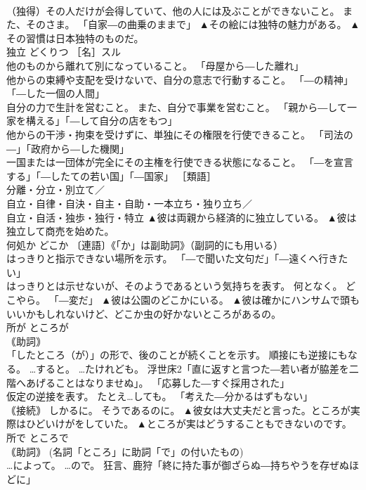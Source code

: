 \documentclass[8pt]{extreport}
\begin{document}
\begin{CJK}{UTF8}{min}
\\	（独得）その人だけが会得していて、他の人には及ぶことができないこと。 また、そのさま。 「自家―の曲乗のままで」	▲その絵には独特の魅力がある。 ▲その習慣は日本独特のものだ。
\\	独立	どくりつ	［名］スル 
\\	他のものから離れて別になっていること。 「母屋から―した離れ」 
\\	他からの束縛や支配を受けないで、自分の意志で行動すること。 「―の精神」「―した一個の人間」 
\\	自分の力で生計を営むこと。 また、自分で事業を営むこと。 「親から―して一家を構える」「―して自分の店をもつ」 
\\	他からの干渉・拘束を受けずに、単独にその権限を行使できること。 「司法の―」「政府から―した機関」 
\\	一国または一団体が完全にその主権を行使できる状態になること。 「―を宣言する」「―したての若い国」「―国家」 ［類語］
\\	分離・分立・別立て／
\\	自立・自律・自決・自主・自助・一本立ち・独り立ち／
\\	自立・自活・独歩・独行・特立	▲彼は両親から経済的に独立している。 ▲彼は独立して商売を始めた。
\\	何処か	どこか	〔連語〕《「か」は副助詞》（副詞的にも用いる） 
\\	はっきりと指示できない場所を示す。 「―で聞いた文句だ」「―遠くへ行きたい」 
\\	はっきりとは示せないが、そのようであるという気持ちを表す。 何となく。 どこやら。 「―変だ」	▲彼は公園のどこかにいる。 ▲彼は確かにハンサムで頭もいいかもしれないけど、どこか虫の好かないところがあるの。
\\	所が	ところが	
\\	｟助詞｠ 
\\	「したところ（が）」の形で、後のことが続くことを示す。 順接にも逆接にもなる。 …すると。 …たけれども。 浮世床2「直に返すと言つた―若い者が脇差を二階へあげることはなりませぬ」。 「応募した―すぐ採用された」 
\\	仮定の逆接を表す。 たとえ…しても。 「考えた―分かるはずもない」 
\\	｟接続｠ しかるに。 そうであるのに。	▲彼女は大丈夫だと言った。ところが実際はひどいけがをしていた。 ▲ところが実はどうすることもできないのです。
\\	所で	ところで	
\\	｟助詞｠ (名詞「ところ」に助詞「で」の付いたもの) 
\\	…によって。 …ので。 狂言、鹿狩「終に持た事が御ざらぬ―持ちやうを存ぜぬほどに」 

\end{CJK}
\end{document}
